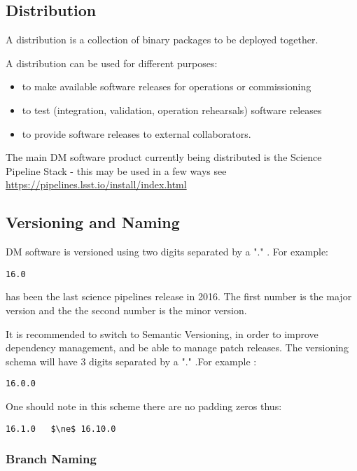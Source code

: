 \subsection{Distribution} \label{sec:distribution}

A distribution is a collection of binary packages to be deployed together.

A distribution can be used for different purposes:

\begin{itemize}
\item to make available software releases for operations or commissioning
\item to test (integration, validation, operation rehearsals) software releases
\item to provide software releases to external collaborators.
\end{itemize}

The main DM software product currently being distributed is the Science Pipeline Stack -
this may be used in a few ways see \url{https://pipelines.lsst.io/install/index.html}


\newpage
\subsection{Versioning and Naming} \label{sec:versioning}

DM software is versioned using two digits separated by a "." .
For example:

\begin{verbatim}
16.0
\end{verbatim}

has been the last science pipelines release in 2016. The first number is the major version and the the second number is the minor version.


It is recommended to switch to Semantic Versioning, in order to improve dependency management, and be able to manage patch releases.
The versioning schema will have 3 digits separated by a "." .For example :

\begin{verbatim}
16.0.0
\end{verbatim}

One should note in this scheme there are no padding zeros thus:
\begin{verbatim}
16.1.0   $\ne$ 16.10.0
\end{verbatim}

\subsubsection{Branch Naming}

